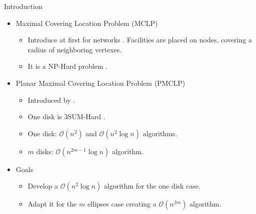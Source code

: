 \documentclass{beamer}
\newcommand{\R}{\mathbb{R}}
\newcommand{\bigO}{\mathscr{O}}
\begin{document}
\begin{frame}{Introduction}
\begin{itemize}

	\item Maximal Covering Location Problem (MCLP)
	
	\begin{itemize}
		\item Introduce at first for networks \autocite{church:1974}. Facilities are placed on nodes, covering a radius of neighboring vertexes.
		
		\item It is a NP-Hard problem \autocite{hatta:2013}.
	\end{itemize}
	\item Planar Maximal Covering Location Problem (PMCLP)
	\begin{itemize}
		\item Introduced by \autocite{church:1984}.
		\item One disk is 3SUM-Hard \autocite{3SUM-kopelowitz:2014}.
		\item One disk: $\bigO(n^2)$ and $\bigO(n^2\log{n})$ algorithms.
		\item $m$ disks: $\bigO(n^{2m-1}\log{n})$ algorithm.
	\end{itemize}
	\item Goals
	\begin{itemize}
		\item Develop a $\bigO(n^2\log{n})$ algorithm for the one disk case.
		\item Adapt it for the $m$ ellipses case creating a $\bigO(n^{2m})$ algorithm.
	\end{itemize}
\end{itemize}

\end{frame} 





	
%			
\end{document}
